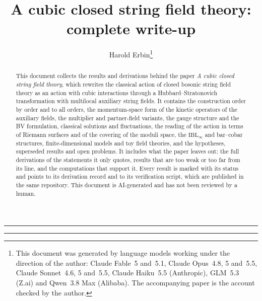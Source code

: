 \documentclass[11pt, a4paper]{article}
\title{A cubic closed string field theory: complete write-up}
\author{Harold Erbin\emailfoot{harold.erbin@gmail.com}\thanks{%
	This document was generated by language models working under the direction of the author: Claude Fable~5 and~5.1, Claude Opus~4.8, 5 and~5.5, Claude Sonnet~4.6, 5 and~5.5, Claude Haiku~5.5 (Anthropic), GLM~5.3 (Z.ai) and Qwen~3.8 Max (Alibaba).
	The accompanying paper is the account checked by the author.%
}}
\renewcommand{\=}[1]{\stackrel{\text{#1}}{=}}
\numberwithin{equation}{section}
\newcommand{\IBL}[0]{\ensuremath{\mathrm{IBL}_\infty}}
\begin{document}
\maketitle

\begin{abstract}
	This document collects the results and derivations behind the paper \emph{A cubic closed string field theory}, which rewrites the classical action of closed bosonic string field theory as an action with cubic interactions through a Hubbard--Stratonovich transformation with multilocal auxiliary string fields.
	It contains the construction order by order and to all orders, the momentum-space form of the kinetic operators of the auxiliary fields, the multiplier and partner-field variants, the gauge structure and the BV formulation, classical solutions and fluctuations, the reading of the action in terms of Riemann surfaces and of the covering of the moduli space, the \IBL{} and bar--cobar structures, finite-dimensional models and toy field theories, and the hypotheses, superseded results and open problems.
	It includes what the paper leaves out: the full derivations of the statements it only quotes, results that are too weak or too far from its line, and the computations that support it.
	Every result is marked with its status and points to its derivation record and to its verification script, which are published in the same repository.
	This document is AI-generated and has not been reviewed by a human.
\end{abstract}

\hrule
{}
\tableofcontents
\bigskip
\hrule

\newpage


















\appendix





\printbibliography[heading=bibintoc]
\end{document}

